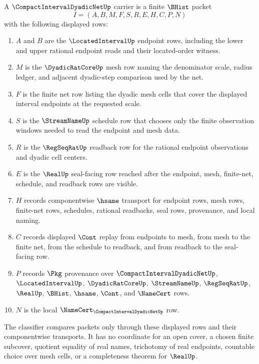 \begin{definition}
\label{def:compact-interval-dyadic-net-carrier}
A $\CompactIntervalDyadicNetUp$ carrier is a finite $\BHist$ packet
$$
I=(A,B,M,F,S,R,E,H,C,P,N)
$$
with the following displayed rows:
\begin{enumerate}
\item $A$ and $B$ are the $\LocatedIntervalUp$ endpoint rows, including the lower and upper rational endpoint reads and their located-order witness.
\item $M$ is the $\DyadicRatCoreUp$ mesh row naming the denominator scale, radius ledger, and adjacent dyadic-step comparison used by the net.
\item $F$ is the finite net row listing the dyadic mesh cells that cover the displayed interval endpoints at the requested scale.
\item $S$ is the $\StreamNameUp$ schedule row that chooses only the finite observation windows needed to read the endpoint and mesh data.
\item $R$ is the $\RegSeqRatUp$ readback row for the rational endpoint observations and dyadic cell centers.
\item $E$ is the $\RealUp$ seal-facing row reached after the endpoint, mesh, finite-net, schedule, and readback rows are visible.
\item $H$ records componentwise $\hsame$ transport for endpoint rows, mesh rows, finite-net rows, schedules, rational readbacks, seal rows, provenance, and local naming.
\item $C$ records displayed $\Cont$ replay from endpoints to mesh, from mesh to the finite net, from the schedule to readback, and from readback to the seal-facing row.
\item $P$ records $\Pkg$ provenance over $\CompactIntervalDyadicNetUp$, $\LocatedIntervalUp$, $\DyadicRatCoreUp$, $\StreamNameUp$, $\RegSeqRatUp$, $\RealUp$, $\BHist$, $\hsame$, $\Cont$, and $\NameCert$ rows.
\item $N$ is the local $\NameCert_{\CompactIntervalDyadicNetUp}$ row.
\end{enumerate}
The classifier compares packets only through these displayed rows and their componentwise transports. It has no coordinate for an open cover, a chosen finite subcover, quotient equality of real names, trichotomy of real endpoints, countable choice over mesh cells, or a completeness theorem for $\RealUp$.
\end{definition}

